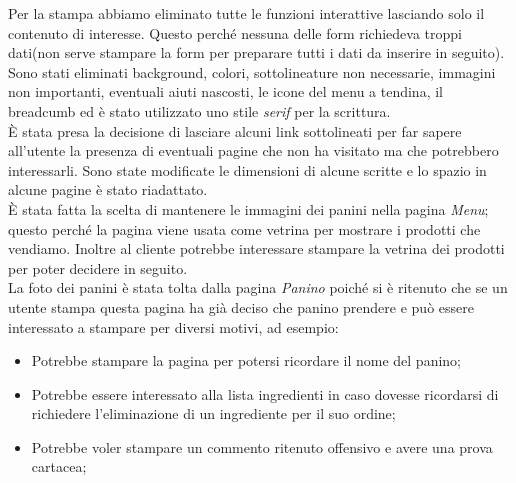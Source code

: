 Per la stampa abbiamo eliminato tutte le funzioni interattive lasciando solo il contenuto di interesse.
Questo perché nessuna delle form richiedeva troppi dati(non serve stampare la form per preparare tutti i dati da inserire in seguito).\\
Sono stati eliminati background, colori, sottolineature non necessarie, immagini non importanti, eventuali aiuti nascosti, le icone del menu a tendina, il breadcumb ed è stato utilizzato uno stile \emph{serif} per la scrittura.\\
È stata presa la decisione di lasciare alcuni link sottolineati per far sapere all'utente la presenza di eventuali pagine che non ha visitato ma che potrebbero interessarli. %
Sono state modificate le dimensioni di alcune scritte e lo spazio in alcune pagine è stato riadattato.\\
È stata fatta la scelta di mantenere le immagini dei panini nella pagina \emph{Menu}; 
questo perché la pagina viene usata come vetrina per mostrare i prodotti che vendiamo.
Inoltre al cliente potrebbe interessare stampare la vetrina dei prodotti per poter decidere in seguito.\\
La foto dei panini è stata tolta dalla pagina \emph{Panino} poiché si è ritenuto che se un utente stampa questa pagina ha già deciso che panino prendere e può essere interessato a stampare per diversi motivi, ad esempio:
\begin{itemize}
	\item Potrebbe stampare la pagina per potersi ricordare il nome del panino;
	\item Potrebbe essere interessato alla lista ingredienti in caso dovesse ricordarsi di richiedere l'eliminazione di un ingrediente per il suo ordine;
	\item Potrebbe voler stampare un commento ritenuto offensivo e avere una prova cartacea;
\end{itemize}